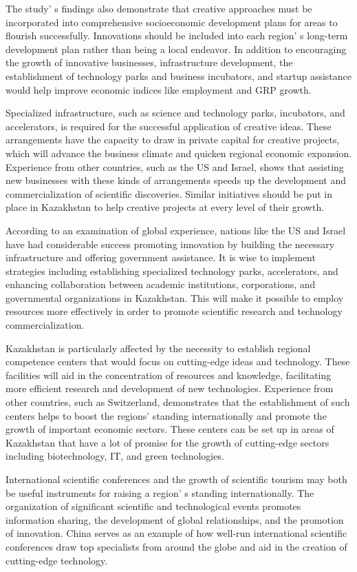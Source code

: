 The study' s findings also demonstrate that creative
approaches must be incorporated into comprehensive socioeconomic
development plans for areas to flourish successfully. Innovations should
be included into each region' s long-term development
plan rather than being a local endeavor. In addition to encouraging the
growth of innovative businesses, infrastructure development, the
establishment of technology parks and business incubators, and startup
assistance would help improve economic indices like employment and GRP
growth.

Specialized infrastructure, such as science and technology parks,
incubators, and accelerators, is required for the successful application
of creative ideas. These arrangements have the capacity to draw in
private capital for creative projects, which will advance the business
climate and quicken regional economic expansion. Experience from other
countries, such as the US and Israel, shows that assisting new
businesses with these kinds of arrangements speeds up the development
and commercialization of scientific discoveries. Similar initiatives
should be put in place in Kazakhstan to help creative projects at every
level of their growth.

According to an examination of global experience, nations like the US
and Israel have had considerable success promoting innovation by
building the necessary infrastructure and offering government
assistance. It is wise to implement strategies including establishing
specialized technology parks, accelerators, and enhancing collaboration
between academic institutions, corporations, and governmental
organizations in Kazakhstan. This will make it possible to employ
resources more effectively in order to promote scientific research and
technology commercialization.

Kazakhstan is particularly affected by the necessity to establish
regional competence centers that would focus on cutting-edge ideas and
technology. These facilities will aid in the concentration of resources
and knowledge, facilitating more efficient research and development of
new technologies. Experience from other countries, such as Switzerland,
demonstrates that the establishment of such centers helps to boost the
regions'{} standing internationally and promote the
growth of important economic sectors. These centers can be set up in
areas of Kazakhstan that have a lot of promise for the growth of
cutting-edge sectors including biotechnology, IT, and green
technologies.

International scientific conferences and the growth of scientific
tourism may both be useful instruments for raising a
region' s standing internationally. The organization of
significant scientific and technological events promotes information
sharing, the development of global relationships, and the promotion of
innovation. China serves as an example of how well-run international
scientific conferences draw top specialists from around the globe and
aid in the creation of cutting-edge technology.

